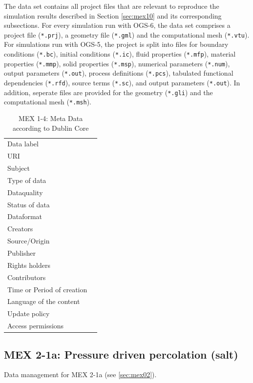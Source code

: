 The data set contains all project files that are relevant to reproduce the simulation results described in Section \ref{sec:mex10} and its corresponding subsections. For every simulation run with OGS-6, the data set comprises a project file (\texttt{*.prj}), a geometry file (\texttt{*.gml}) and the computational mesh (\texttt{*.vtu}). For simulations run with OGS-5, the project is split into files for boundary conditions (\texttt{*.bc}), initial conditions (\texttt{*.ic}), fluid properties (\texttt{*.mfp}), material properties (\texttt{*.mmp}), solid properties (\texttt{*.msp}), numerical parameters (\texttt{*.num}), output parameters (\texttt{*.out}), process definitions (\texttt{*.pcs}), tabulated functional dependencies (\texttt{*.rfd}), source terms (\texttt{*.sc}), and output parameters (\texttt{*.out}). In addition, seperate files are provided for the geometry (\texttt{*.gli}) and the computational mesh (\texttt{*.msh}).

\begin{table}[h!]
\caption{MEX 1-4: Meta Data according to Dublin Core}
\label{tab:}
\small
\begin{tabular}{R{3cm}|L{7cm}}
\hline
%
Data label &  \\
URI &  \\
Subject  &  \\
Type of data  &  \\
Dataquality  &  \\
Status of data  &  \\
Dataformat  & \\
Creators  &  \\
Source/Origin &  \\
Publisher  &  \\
Rights holders &  \\
Contributors &  \\
Time or Period of creation &  \\
Language of the content &  \\
Update policy &  \\
Access permissions &  \\
%
\hline
\end{tabular}
\end{table}

\subsection{MEX 2-1a: Pressure driven percolation (salt)}

Data management for MEX 2-1a (see \ref{sec:mex02}).

